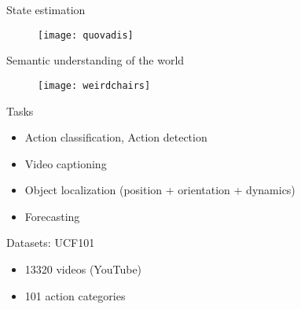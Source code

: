 \begin{frame}{State estimation}

  \begin{figure}
    \texttt{[image: quovadis]}
  \end{figure}

\end{frame}


\begin{frame}{Semantic understanding of the world}

  \begin{figure}
    \texttt{[image: weirdchairs]}
  \end{figure}

\end{frame}


\begin{frame}{Tasks}

  \begin{itemize}
    \item Action classification, Action detection
    \item Video captioning
    \item Object localization (position + orientation + dynamics)
    \item Forecasting
  \end{itemize}

\end{frame}


\begin{frame}{Datasets: UCF101}

  \begin{itemize}
    \item 13320 videos (YouTube)
    \item 101 action categories
  \end{itemize}


\end{frame}


